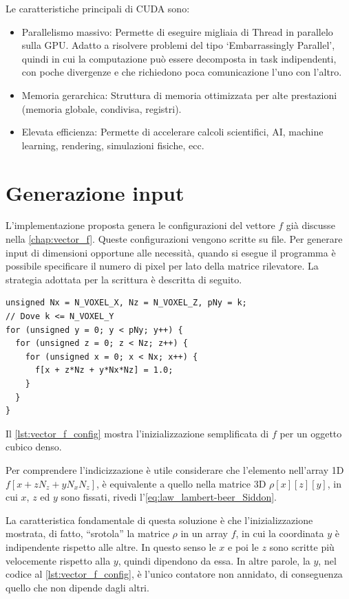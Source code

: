 \documentclass[12pt,a4paper]{report}
\begin{document}
Le caratteristiche principali di CUDA sono:
\begin{itemize}
  \item Parallelismo massivo: Permette di eseguire migliaia di Thread in parallelo sulla GPU. Adatto a risolvere problemi del
        tipo `Embarrassingly Parallel', quindi in cui la computazione può essere decomposta in task indipendenti, con poche
        divergenze e che richiedono poca comunicazione l'uno con l'altro.
  \item Memoria gerarchica: Struttura di memoria ottimizzata per alte prestazioni (memoria globale, condivisa, registri).
  \item Elevata efficienza: Permette di accelerare calcoli scientifici, AI, machine learning, rendering, simulazioni fisiche, ecc.
\end{itemize}

\section{Generazione input}

L'implementazione proposta genera le configurazioni del vettore \(f\) già discusse nella \autoref{chap:vector_f}.
Queste configurazioni vengono scritte su file.
Per generare input di dimensioni opportune alle necessità, quando si esegue il programma è possibile specificare il numero di
pixel per lato della matrice rilevatore.
La strategia adottata per la scrittura è descritta di seguito.

\begin{lstlisting}[language=CStyle, caption={Codice C per inizializzazione di \(f\) per un cubo.}, label={lst:vector_f_config}]
unsigned Nx = N_VOXEL_X, Nz = N_VOXEL_Z, pNy = k;
// Dove k <= N_VOXEL_Y
for (unsigned y = 0; y < pNy; y++) {
  for (unsigned z = 0; z < Nz; z++) {
    for (unsigned x = 0; x < Nx; x++) {
      f[x + z*Nz + y*Nx*Nz] = 1.0;
    }
  }
}
\end{lstlisting}

Il \autoref{lst:vector_f_config} mostra l'inizializzazione semplificata di \(f\) per un oggetto cubico denso.

Per comprendere l'indicizzazione è utile considerare che l'elemento nell'array 1D \(f[x + z N_z + y N_x N_z]\), è equivalente a
quello nella matrice 3D \(\rho[x][z][y]\), in cui \(x\), \(z\) ed \(y\)  sono fissati, rivedi l'\autoref{eq:law_lambert-beer_Siddon}.

La caratteristica fondamentale di questa soluzione è che l'inizializzazione mostrata, di fatto, ``srotola'' la matrice
\(\rho\) in un array \(f\), in cui la coordinata \(y\) è indipendente rispetto alle altre.
In questo senso le \(x\) e poi le \(z\) sono scritte più velocemente rispetto alla \(y\), quindi dipendono da essa.
In altre parole, la \(y\), nel codice al \autoref{lst:vector_f_config}, è l'unico contatore non annidato, di conseguenza quello
che non dipende dagli altri.
\end{document}
